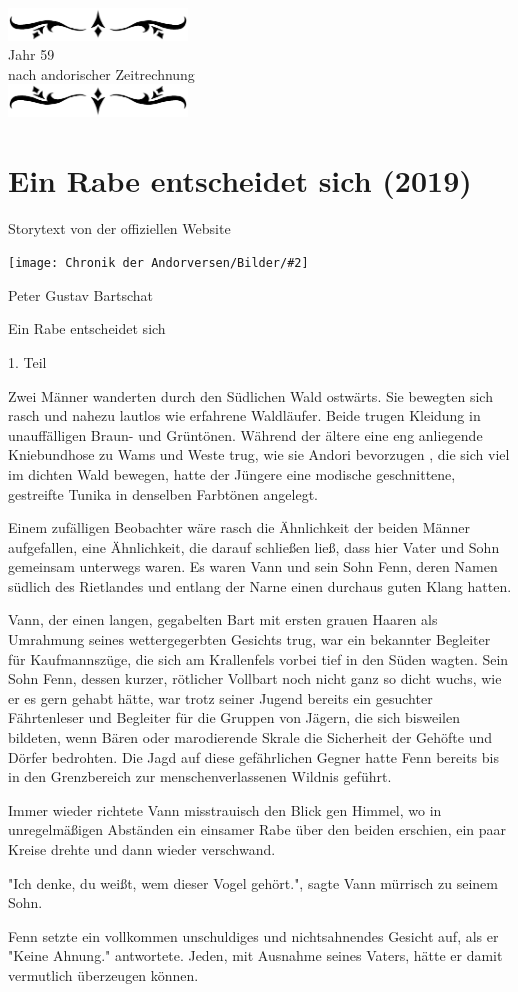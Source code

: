 \documentclass[10pt, a4paper, oneside]{book}
\newcommand{\storytext}[1]{%
    \section{#1}%
    \label{Storytext: #1}%
}
\newcommand{\bildmitts}[2][height=0.32\textwidth,width=0.48\textwidth,keepaspectratio]{%
    \begin{center}
        \texttt{[image: Chronik der Andorversen/Bilder/\#2]}
    \end{center}
}
\newcommand{\az}[1]{%
    \begin{center}
        \includegraphics[width=180px]{Chronik der Andorversen/verzierung1.png}\\
        {\Huge #1} \\
        {nach andorischer Zeitrechnung}\\
        \includegraphics[width=180px]{Chronik der Andorversen/verzierung2.png}
    \end{center}
    \extramarks{}{#1 a.Z.}
}
\begin{document}
\begin{multicols}{2}
\az{Jahr 59}


\storytext{Ein Rabe entscheidet sich (2019)}

\begin{center}
    Storytext von der offiziellen Website
\end{center}

\bildmitts{Ein Rabe entscheidet sich Bild 1.jpg}

Peter Gustav Bartschat

Ein Rabe entscheidet sich 

1. Teil\bigskip

Zwei Männer wanderten durch den Südlichen Wald ostwärts. Sie bewegten sich rasch und nahezu lautlos wie erfahrene Waldläufer. Beide trugen Kleidung in unauffälligen Braun- und Grüntönen. Während der ältere eine eng anliegende Kniebundhose zu Wams und Weste trug, wie sie Andori bevorzugen , die sich viel im dichten Wald bewegen, hatte der Jüngere eine modische geschnittene, gestreifte Tunika in denselben Farbtönen angelegt.

Einem zufälligen Beobachter wäre rasch die Ähnlichkeit der beiden Männer aufgefallen, eine Ähnlichkeit, die darauf schließen ließ, dass hier Vater und Sohn gemeinsam unterwegs waren. Es waren Vann und sein Sohn Fenn, deren Namen südlich des Rietlandes und entlang der Narne einen durchaus guten Klang hatten.

Vann, der einen langen, gegabelten Bart mit ersten grauen Haaren als Umrahmung seines wettergegerbten Gesichts trug, war ein bekannter Begleiter für Kaufmannszüge, die sich am Krallenfels vorbei tief in den Süden wagten. Sein Sohn Fenn, dessen kurzer, rötlicher Vollbart noch nicht ganz so dicht wuchs, wie er es gern gehabt hätte, war trotz seiner Jugend bereits ein gesuchter Fährtenleser und Begleiter für die Gruppen von Jägern, die sich bisweilen bildeten, wenn Bären oder marodierende Skrale die Sicherheit der Gehöfte und Dörfer bedrohten. Die Jagd auf diese gefährlichen Gegner hatte Fenn bereits bis in den Grenzbereich zur menschenverlassenen Wildnis geführt.

Immer wieder richtete Vann misstrauisch den Blick gen Himmel, wo in unregelmäßigen Abständen ein einsamer Rabe über den beiden erschien, ein paar Kreise drehte und dann wieder verschwand.

"Ich denke, du weißt, wem dieser Vogel gehört.", sagte Vann mürrisch zu seinem Sohn.

Fenn setzte ein vollkommen unschuldiges und nichtsahnendes Gesicht auf, als er "Keine Ahnung." antwortete. Jeden, mit Ausnahme seines Vaters, hätte er damit vermutlich überzeugen können.


\end{multicols}
\end{document}
